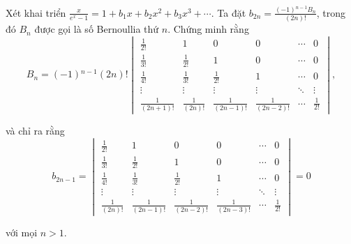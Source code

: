 \documentclass[class=linearalgebra,crop=false]{standalone}
\begin{document}
\begin{exercise}
    \par Xét khai triển $\frac{x}{e^{x} - 1} = 1 + b_{1}x + b_{2}x^{2} + b_{3}x^{3} + \cdots$. Ta đặt $b_{2n} = \frac{(-1){}^{n-1}B_{n}}{(2n)!}$, trong đó $B_{n}$ được gọi là số Bernoullia thứ $n$. Chứng minh rằng
    \[
        B_{n} = (-1){}^{n-1}(2n)!
        \begin{vmatrix}
            \frac{1}{2!}      & 1               & 0                 & 0                 & \cdots & 0            \\
            \frac{1}{3!}      & \frac{1}{2!}    & 1                 & 0                 & \cdots & 0            \\
            \frac{1}{4!}      & \frac{1}{3!}    & \frac{1}{2!}      & 1                 & \cdots & 0            \\
            \vdots            & \vdots          & \vdots            & \vdots            & \ddots & \vdots       \\
            \frac{1}{(2n+1)!} & \frac{1}{(2n)!} & \frac{1}{(2n-1)!} & \frac{1}{(2n-2)!} & \cdots & \frac{1}{2!}
        \end{vmatrix},
    \]
    \par và chỉ ra rằng
    \[
        b_{2n-1} =
        \begin{vmatrix}
            \frac{1}{2!}    & 1                 & 0                 & 0                 & \cdots & 0            \\
            \frac{1}{3!}    & \frac{1}{2!}      & 1                 & 0                 & \cdots & 0            \\
            \frac{1}{4!}    & \frac{1}{3!}      & \frac{1}{2!}      & 1                 & \cdots & 0            \\
            \vdots          & \vdots            & \vdots            & \vdots            & \ddots & \vdots       \\
            \frac{1}{(2n)!} & \frac{1}{(2n-1)!} & \frac{1}{(2n-2)!} & \frac{1}{(2n-3)!} & \cdots & \frac{1}{2!}
        \end{vmatrix}
        = 0
    \]
    \par với mọi $n > 1$.
\end{exercise}
\end{document}
